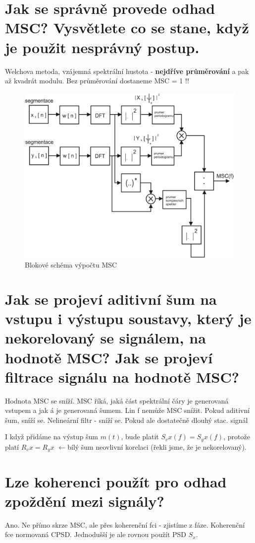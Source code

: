 \documentclass[a4paper,12pt]{article}   %
\newcommand{\llarr}{$\leftarrow$}
\newcommand{\mt}[1]{$#1$}
\begin{document}
\section{Jak se správně provede odhad MSC? Vysvětlete co se stane, když je použit nesprávný postup.}

Welchova metoda, vzájemná spektrální hustota - \textbf{nejdříve průměrování} a pak až kvadrát modulu. Bez průměrování dostaneme MSC = 1 !!
\begin{figure}[h!]
        \centering
        \includegraphics[width=.7\textwidth]{fig/MSC_blokove_schema.png}
        \caption*{Blokové schéma výpočtu MSC}
\end{figure}
\FloatBarrier


\section{Jak se projeví aditivní šum na vstupu i výstupu soustavy, který je nekorelovaný se signálem, na hodnotě MSC? Jak se projeví filtrace signálu na hodnotě MSC?}

Hodnota MSC se sníží. MSC říká, jaká část spektrální čáry je generovaná vstupem a jak á je generovaná šumem. Lin f nemůže MSC snížit. Pokud aditivní šum, sníží se. Nelineární filtr - sníží se. Pokud ale dostatečně dlouhý stac. signál

I když přidáme na výstup šum \mt{m(t)}, bude platit \mt{S_vx(f) = S_yx(f)}, protože platí \mt{R_vx = R_yx} \llarr bílý šum neovlivní korelaci (řekli jsme, že je nekorelovaný). 


\section{Lze koherenci použít pro odhad zpoždění mezi signály?}

Ano. Ne přímo skrze MSC, ale přes koherenční fci - zjistíme z fáze. Koherenční fce  normovaná CPSD. Jednodušší je ale rovnou použít PSD \mt{S_x}.
\end{document}
